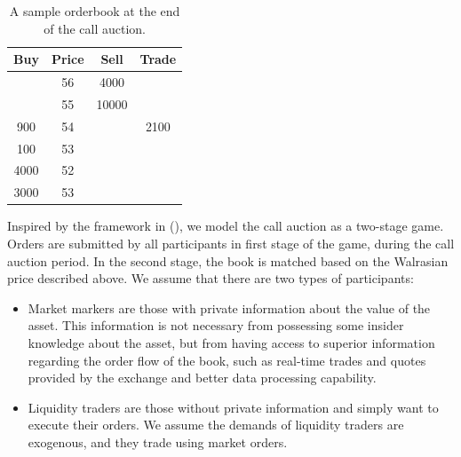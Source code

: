 \documentclass{article}
\begin{document}
\begin{table}[]
  \centering
  \begin{tabular}{c|c|c|c}
    \hline
    \textbf{Buy} & \textbf{Price} & \textbf{Sell} & \textbf{Trade} \\ \hline
                 & 56             & 4000          &                \\ \hline
                 & 55             & 10000         &                \\ \hline
    900          & 54             &               & 2100           \\ \hline
    100          & 53             &               &                \\ \hline
    4000         & 52             &               &                \\ \hline
    3000         & 53             &               &                \\ \hline
  \end{tabular}
  \caption{A sample orderbook at the end of the call auction.}
  \label{itayoseTable2}
\end{table}

Inspired by the framework in (\cite{Madhavan2015}), we model the call auction as a two-stage game. Orders are submitted by all participants in first stage of the game, during the call auction period. In the second stage, the book is matched based on the Walrasian price described above. We assume that there are two types of participants:

\begin{itemize}
  \item Market markers are those with private information about the value of the asset. This information is not necessary from possessing some insider knowledge about the asset, but from having access to superior information regarding the order flow of the book, such as real-time trades and quotes provided by the exchange and better data processing capability.
  \item Liquidity traders are those without private information and simply want to execute their orders. We assume the demands of liquidity traders are exogenous, and they trade using market orders.
\end{itemize}
\end{document}
